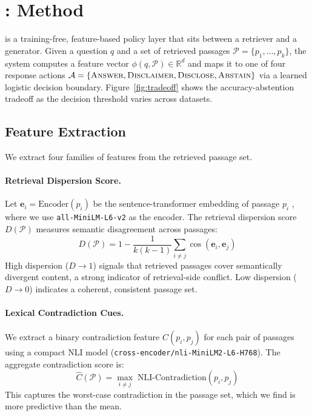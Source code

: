 \section{\method{}: Method}
\label{sec:method}

\method{} is a training-free, feature-based policy layer that sits between a retriever and a generator. Given a question $q$ and a set of retrieved passages $\mathcal{P} = \{p_1, \ldots, p_k\}$, the system computes a feature vector $\phi(q, \mathcal{P}) \in \mathbb{R}^d$ and maps it to one of four response actions $\mathcal{A} = \{\textsc{Answer}, \textsc{Disclaimer}, \textsc{Disclose}, \textsc{Abstain}\}$ via a learned logistic decision boundary. Figure~\ref{fig:tradeoff} shows the accuracy-abstention tradeoff as the decision threshold varies across datasets.

\subsection{Feature Extraction}

We extract four families of features from the retrieved passage set.

\paragraph{Retrieval Dispersion Score.}
Let $\mathbf{e}_i = \text{Encoder}(p_i)$ be the sentence-transformer embedding of passage $p_i$ \citep{reimers2019sentence}, where we use \mbox{\texttt{all-MiniLM-L6-v2}} as the encoder. The retrieval dispersion score $D(\mathcal{P})$ measures semantic disagreement across passages:
\begin{equation}
D(\mathcal{P}) = 1 - \frac{1}{k(k-1)} \sum_{i \neq j} \cos(\mathbf{e}_i, \mathbf{e}_j)
\label{eq:dispersion}
\end{equation}
High dispersion ($D \to 1$) signals that retrieved passages cover semantically divergent content, a strong indicator of retrieval-side conflict. Low dispersion ($D \to 0$) indicates a coherent, consistent passage set.

\paragraph{Lexical Contradiction Cues.}
We extract a binary contradiction feature $C(p_i, p_j)$ for each pair of passages using a compact NLI model (\texttt{cross-encoder/nli-MiniLM2-L6-H768}). The aggregate contradiction score is:
\begin{equation}
\hat{C}(\mathcal{P}) = \max_{i \neq j} \; \text{NLI-Contradiction}(p_i, p_j)
\end{equation}
This captures the worst-case contradiction in the passage set, which we find is more predictive than the mean.

